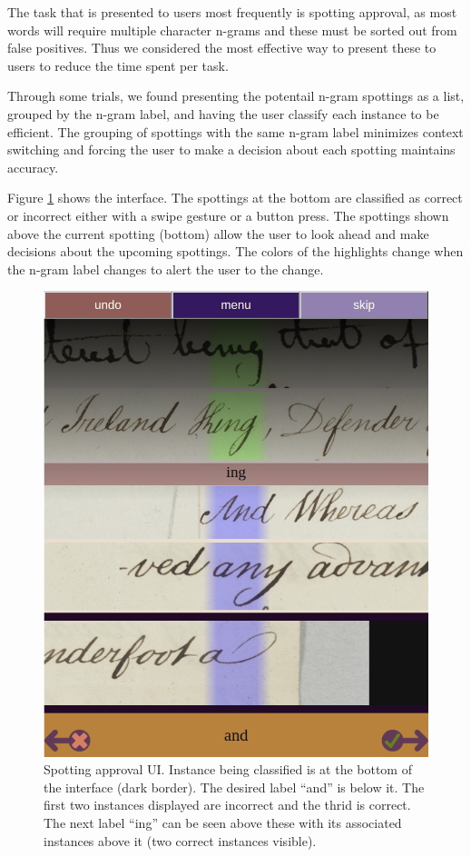 \documentclass[ms,electronic,twosidetoc,letterpaper,chaptercenter,parttop,lof,lot]{byumsphd}
\begin{document}
The task that is presented to users most frequently is spotting approval, as most words will require multiple character n-grams and these must be sorted out from false positives. Thus we considered the most effective way to present these to users to reduce the time spent per task.


Through some trials, we found presenting the potentail n-gram spottings as a list, grouped by the n-gram label, and having the user classify each instance to be efficient. The grouping of spottings with the same n-gram label minimizes context switching and forcing the user to make a decision about each spotting maintains accuracy.

Figure \ref{fig:spottingapproval} shows the interface. The spottings at the bottom are classified as correct or incorrect either with a swipe gesture or a button press. The spottings shown above the current spotting (bottom) allow the user to look ahead and make decisions about the upcoming spottings. The colors of the highlights change when the n-gram label changes to alert the user to the change.

\begin{figure}
    \centering
    \includegraphics[width=.75\textwidth]{spottingapproval}
    \caption{Spotting approval UI. Instance being classified is at the bottom of the interface (dark border). The desired label ``and'' is below it. The first two instances displayed are incorrect and the thrid is correct. The next label ``ing'' can be seen above these with its associated instances above it (two correct instances visible).
    }
    \label{fig:spottingapproval}
\end{figure}
\end{document}
